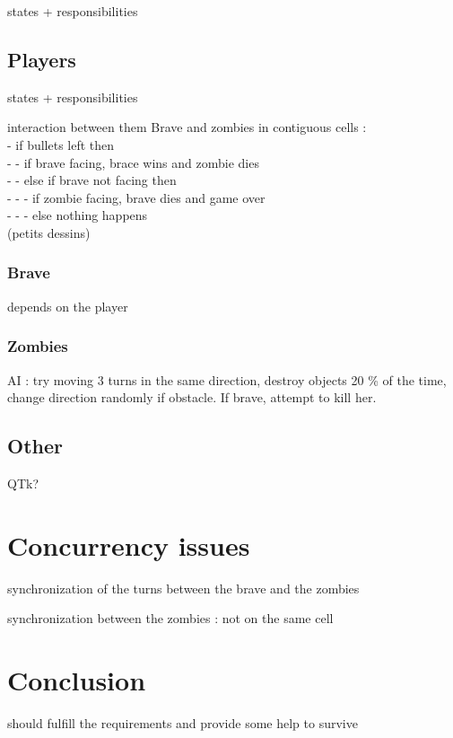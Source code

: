 \documentclass[12pt,a4paper]{article}
\begin{document}
states + responsibilities


\subsection{Players}
states + responsibilities

interaction between them
Brave and zombies in contiguous cells : \\
- if bullets left then \\
- - if brave facing, brace wins  and zombie dies\\
- - else if brave not facing then \\
- - - if zombie facing, brave dies and game over \\
- - - else nothing happens \\
(petits dessins)
\subsubsection{Brave}
depends on the player

\subsubsection{Zombies}
AI : try moving 3 turns in the same direction, destroy objects 20 \% of the time, change direction randomly if obstacle. If brave, attempt to kill her.

\subsection{Other}
QTk?

\section{Concurrency issues}
synchronization of the turns between the brave and the zombies

synchronization between the zombies : not on the same cell
    
\section*{Conclusion}
should fulfill the requirements and provide some help to survive
    
\end{document}
